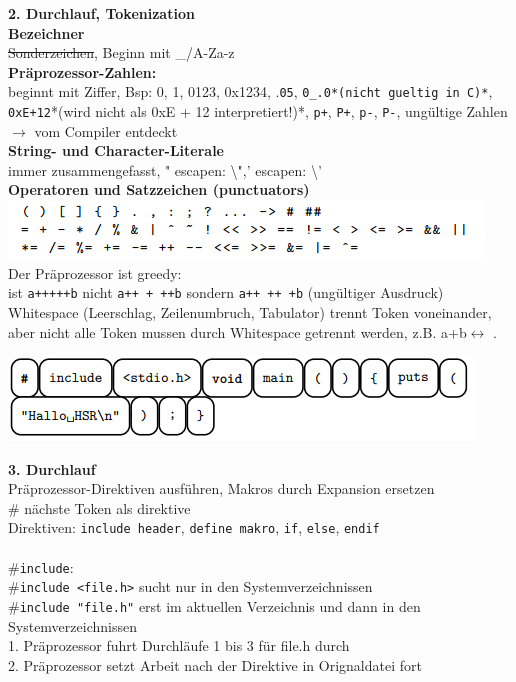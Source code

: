 \documentclass[10pt,landscape,a4paper]{article}
\newcommand{\prgc}[1]{\texttt{#1}}
\begin{document}
\begin{multicols*}{3}
\textbf{2. Durchlauf, Tokenization}\\ 
\textbf{Bezeichner}\\
\sout{Sonderzeichen}, Beginn mit \_/A-Za-z\\
\textbf{Präprozessor-Zahlen: }\\
beginnt mit Ziffer, Bsp: 0, 1, 0123, 0x1234, .\prgc{05}, \prgc{0_.0}\prgc{*(nicht gueltig in C)*}, 
\prgc{0xE+12}*(wird nicht als 0xE + 12 interpretiert!)*, \prgc{p+}, \prgc{P+}, \prgc{p-}, \prgc{P-}, ungültige Zahlen $\rightarrow$ vom Compiler entdeckt\\
\textbf{String- und Character-Literale}\\
immer zusammengefasst, " escapen: \textbackslash",' escapen: \textbackslash'\\
\textbf{Operatoren und Satzzeichen (punctuators)}\\
\includegraphics[width = \columnwidth]{op.PNG}\\
Der Präprozessor ist greedy:\\
ist \prgc{a+++++b} nicht \prgc{a++ + ++b} sondern \prgc{a++ ++ +b} (ungültiger Ausdruck)\\

Whitespace (Leerschlag, Zeilenumbruch, Tabulator) trennt Token voneinander, aber
nicht alle Token mussen durch Whitespace getrennt werden, z.B. a+b$\leftrightarrow$ \fbox{+} .

\includegraphics[width = \columnwidth]{token.PNG}

\textbf{3. Durchlauf}\\
Präprozessor-Direktiven ausführen, Makros durch Expansion ersetzen\\
\# nächste Token als direktive\\
Direktiven: \prgc{include header}, \prgc{define makro}, \prgc{if}, \prgc{else}, \prgc{endif}\\

\\\#\prgc{include}:\\
\#\prgc{include <file.h>} sucht nur in den Systemverzeichnissen\\
\#\prgc{include "file.h"} erst im aktuellen Verzeichnis und dann in den
Systemverzeichnissen\\
1. Präprozessor fuhrt Durchläufe 1 bis 3 für file.h durch\\
2. Präprozessor setzt Arbeit nach der Direktive in Orignaldatei fort


\end{multicols*}
\end{document}
